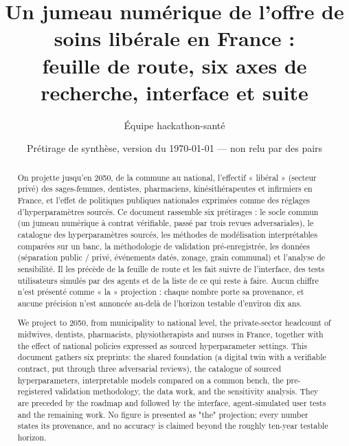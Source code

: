 \documentclass[11pt]{article}
\title{Un jumeau numérique de l'offre de soins libérale en France :\\
feuille de route, six axes de recherche, interface et suite}
\author[1]{Équipe hackathon-santé}
\affil[1]{Projet « jumeau numérique de l'offre de soins », dépôt \texttt{hackathon-sante/v2}}
\date{Prétirage de synthèse, version du \today{} --- non relu par des pairs}
\begin{document}
\maketitle

\begin{abstract}
On projette jusqu'en 2050, de la commune au national, l'effectif « libéral » (secteur privé) des
sages-femmes, dentistes, pharmaciens, kinésithérapeutes et infirmiers en France, et l'effet de
politiques publiques nationales exprimées comme des réglages d'hyperparamètres sourcés. Ce
document rassemble six prétirages :
le socle commun (un jumeau numérique à contrat vérifiable, passé par trois revues
adversariales), le catalogue des hyperparamètres sourcés, les méthodes de modélisation
interprétables comparées sur un banc, la méthodologie de validation pré-enregistrée, les données
(séparation public / privé, événements datés, zonage, grain communal) et l'analyse de
sensibilité. Il les précède de la feuille de route et les fait suivre de l'interface, des tests
utilisateurs simulés par des agents et de la liste de ce qui reste à faire. Aucun chiffre n'est
présenté comme « la » projection : chaque nombre porte sa provenance, et aucune précision n'est
annoncée au-delà de l'horizon testable d'environ dix ans.
\end{abstract}
\begin{otherlanguage}{english}
\begin{abstract}
We project to 2050, from municipality to national level, the private-sector headcount of
midwives, dentists, pharmacists, physiotherapists and nurses in France, together with the effect
of national policies expressed as sourced hyperparameter settings. This document gathers six
preprints: the shared foundation (a digital twin with a verifiable contract, put through three
adversarial reviews), the catalogue of sourced hyperparameters, interpretable models compared on
a common bench, the pre-registered validation methodology, the data work, and the sensitivity
analysis. They are preceded by the roadmap and followed by the interface, agent-simulated user
tests and the remaining work. No figure is presented as "the" projection; every number states
its provenance, and no accuracy is claimed beyond the roughly ten-year testable horizon.
\end{abstract}
\end{otherlanguage}

\tableofcontents
\clearpage






\clearpage



\appendix

\end{document}
